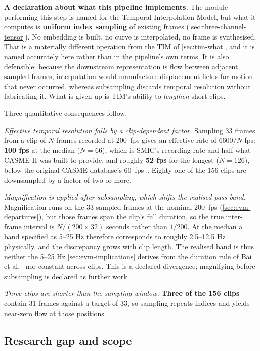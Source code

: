 \textbf{A declaration about what this pipeline implements.} The module performing this step is named for the Temporal Interpolation Model, but what it computes is \textbf{uniform index sampling} of existing frames (\autoref{sec:three-channel-tensor}). No embedding is built, no curve is interpolated, no frame is synthesised. That is a materially different operation from the TIM of \autoref{sec:tim-what}, and it is named accurately here rather than in the pipeline's own terms. It is also defensible: because the downstream representation is flow between adjacent sampled frames, interpolation would manufacture displacement fields for motion that never occurred, whereas subsampling discards temporal resolution without fabricating it. What is given up is TIM's ability to \textit{lengthen} short clips.

Three quantitative consequences follow.

\textit{Effective temporal resolution falls by a clip-dependent factor.} Sampling 33 frames from a clip of $N$ frames recorded at 200~fps gives an effective rate of $6600/N$ fps: \textbf{100 fps} at the median ($N = 66$), which is SMIC's recording rate and half what CASME II was built to provide, and roughly \textbf{52 fps} for the longest ($N = 126$), below the original CASME database's 60~fps~\cite{yan2014}. Eighty-one of the 156 clips are downsampled by a factor of two or more.

\textit{Magnification is applied after subsampling, which shifts the realised pass-band.} Magnification runs on the 33 sampled frames at the nominal 200~fps (\autoref{sec:evm-departures}), but those frames span the clip's full duration, so the true inter-frame interval is $N/(200 \times 32)$ seconds rather than $1/200$. At the median a band specified as 5--25 Hz therefore corresponds to roughly 2.5--12.5 Hz physically, and the discrepancy grows with clip length. The realised band is thus neither the 5--25 Hz \autoref{sec:evm-implications} derives from the duration rule of Bai et al.~\cite{bai2021} nor constant across clips. This is a declared divergence; magnifying before subsampling is declared as further work.

\textit{Three clips are shorter than the sampling window.} \textbf{Three of the 156 clips} contain 31 frames against a target of 33, so sampling repeats indices and yields near-zero flow at those positions.

\subsection{Research gap and scope}
\label{sec:tim-gap}

